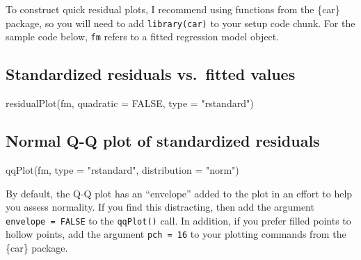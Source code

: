 \documentclass[
  letterpaper,
  DIV=11,
  numbers=noendperiod]{scrartcl}
\newenvironment{Shaded}{\begin{snugshade}}{\end{snugshade}}
\newcommand{\AttributeTok}[1]{\textcolor[rgb]{0.40,0.45,0.13}{#1}}
\newcommand{\ConstantTok}[1]{\textcolor[rgb]{0.56,0.35,0.01}{#1}}
\newcommand{\FunctionTok}[1]{\textcolor[rgb]{0.28,0.35,0.67}{#1}}
\newcommand{\NormalTok}[1]{\textcolor[rgb]{0.00,0.23,0.31}{#1}}
\newcommand{\StringTok}[1]{\textcolor[rgb]{0.13,0.47,0.30}{#1}}
\begin{document}
\begin{tcolorbox}[enhanced jigsaw, coltitle=black, bottomtitle=1mm, colframe=quarto-callout-note-color-frame, left=2mm, title=\textcolor{quarto-callout-note-color}{\faInfo}\hspace{0.5em}{Residual plots in R}, colbacktitle=quarto-callout-note-color!10!white, breakable, rightrule=.15mm, arc=.35mm, opacityback=0, toptitle=1mm, bottomrule=.15mm, leftrule=.75mm, titlerule=0mm, colback=white, opacitybacktitle=0.6, toprule=.15mm]
To construct quick residual plots, I recommend using functions from the
\{car\} package, so you will need to add \texttt{library(car)} to your
setup code chunk. For the sample code below, \texttt{fm} refers to a
fitted regression model object.

\hypertarget{standardized-residuals-vs.-fitted-values}{%
\subsection{Standardized residuals vs.~fitted
values}\label{standardized-residuals-vs.-fitted-values}}

\begin{Shaded}
\begin{Highlighting}[]
\FunctionTok{residualPlot}\NormalTok{(fm, }\AttributeTok{quadratic =} \ConstantTok{FALSE}\NormalTok{, }\AttributeTok{type =} \StringTok{"rstandard"}\NormalTok{)}
\end{Highlighting}
\end{Shaded}

\hypertarget{normal-q-q-plot-of-standardized-residuals}{%
\subsection{Normal Q-Q plot of standardized
residuals}\label{normal-q-q-plot-of-standardized-residuals}}

\begin{Shaded}
\begin{Highlighting}[]
\FunctionTok{qqPlot}\NormalTok{(fm, }\AttributeTok{type =} \StringTok{"rstandard"}\NormalTok{, }\AttributeTok{distribution =} \StringTok{"norm"}\NormalTok{)}
\end{Highlighting}
\end{Shaded}

By default, the Q-Q plot has an ``envelope'' added to the plot in an
effort to help you assess normality. If you find this distracting, then
add the argument \texttt{envelope\ =\ FALSE} to the \texttt{qqPlot()}
call. In addition, if you prefer filled points to hollow points, add the
argument \texttt{pch\ =\ 16} to your plotting commands from the \{car\}
package.
\end{tcolorbox}
\end{document}
